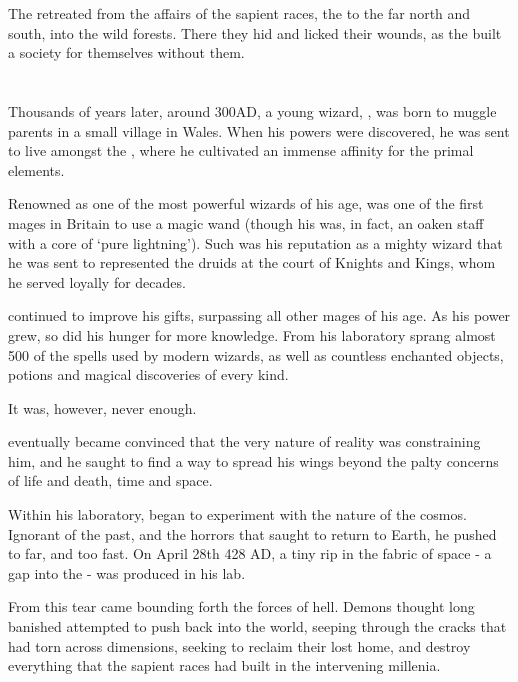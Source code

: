 \documentclass[oneside, 9pt,english]{extbook}
\begin{document}
	The  retreated from the affairs of the sapient races, the  to the far north and south,  into the wild forests. There they hid and licked their wounds, as the  built a society for themselves without them.
	
	\section{}
	
	Thousands of years later, around 300AD, a young wizard, , was born to muggle parents in a small village in Wales. When his powers were discovered, he was sent to live amongst the , where he cultivated an immense affinity for the primal elements. 
	
	Renowned as one of the most powerful wizards of his age,  was one of the first mages in Britain to use a magic wand (though his was, in fact, an oaken staff with a core of `pure lightning'). Such was his reputation as a mighty wizard that he was sent to represented the druids at the court of Knights and Kings, whom he served loyally for decades. 
	
	 continued to improve his gifts, surpassing all other mages of his age. As his power grew, so did his hunger for more knowledge. From his laboratory sprang almost 500 of the spells used by modern wizards, as well as countless enchanted objects, potions and magical discoveries of every kind. 
	
	It was, however, never enough. 
	
	 eventually became convinced that the very nature of reality was constraining him, and he saught to find a way to spread his wings beyond the palty concerns of life and death, time and space. 
	
	Within his laboratory,  began to experiment with the nature of the cosmos. Ignorant of the past, and the horrors that saught to return to Earth, he pushed to far, and too fast. On April 28th 428 AD, a tiny rip in the fabric of space - a gap into the  - was produced in his lab. 
	
	From this tear came bounding forth the forces of hell. Demons thought long banished attempted to push back into the world, seeping through the cracks that  had torn across dimensions, seeking to reclaim their lost home, and destroy everything that the sapient races had built in the intervening millenia. 
	
\end{document}
